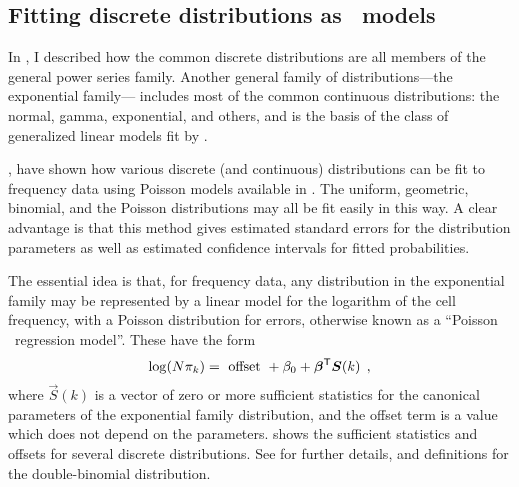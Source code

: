 \subsection{Fitting discrete distributions as \loglin\ models}
In , I described how the common discrete distributions
are all members of the general power series family.
Another general family of distributions---the exponential family---%
includes most of the common continuous distributions:
the normal, gamma, exponential, and others,
and is the basis of the class of generalized linear models fit
by .

\citet{LindseyMersch:92}, \citet[6.1]{Lindsey:95} have shown how various discrete
(and continuous)
distributions can be fit to frequency data using Poisson \loglin{} models
available in .  The uniform, geometric, binomial, and the
Poisson distributions may all be fit easily in this way.
A clear advantage is that this method gives estimated standard errors for the
distribution parameters as well as estimated confidence intervals
for fitted probabilities.

The essential idea is that, for frequency data, any distribution in the
exponential family may be represented by a linear model for the logarithm
of the cell frequency, with a Poisson distribution for errors,
otherwise known as a ``Poisson \loglin\ regression model''.
These have the form
\begin{equation*}
\log (N \pi_k) = \textrm{ offset } + \beta_0 + \bm{\beta}^\mathsf{T} \bm{S}(k)
 \:\: ,
\end{equation*}
where $\vec{S}(k)$ is a vector of zero or more sufficient statistics for the
canonical parameters of the exponential family distribution,
and the offset term is a value which does not depend on the
parameters.   shows the sufficient statistics and
offsets for several discrete distributions.
See \citet{LindseyMersch:92} for further details, and definitions
for the double-binomial distribution.




